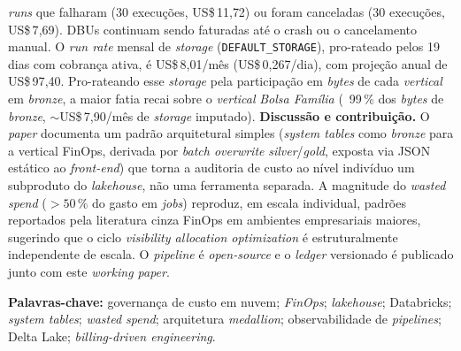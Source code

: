 \documentclass[12pt,a4paper,oneside]{article}
\newcommand{\us}{US\$\,}
\begin{document}
\begin{singlespace}
\textit{runs} que falharam (30 execuções, \us 11{,}72) ou foram
canceladas (30 execuções, \us 7{,}69). DBUs continuam sendo
faturadas até o crash ou o cancelamento manual. O \textit{run rate}
mensal de \textit{storage} (\texttt{DEFAULT\_STORAGE}), pro-rateado
pelos 19 dias com cobrança ativa, é \us 8{,}01/mês
(\us 0{,}267/dia), com projeção anual de \us 97{,}40. Pro-rateando
esse \textit{storage} pela participação em \textit{bytes} de cada
\textit{vertical} em \textit{bronze}, a maior fatia recai sobre o
\textit{vertical} \textit{Bolsa Família} (~99\,\% dos \textit{bytes}
de \textit{bronze}, \(\sim\)\us 7{,}90/mês de \textit{storage}
imputado). \textbf{Discussão e contribuição.} O \textit{paper}
documenta um padrão arquitetural simples (\textit{system tables}
como \textit{bronze} para a vertical FinOps, derivada por
\textit{batch overwrite} \textit{silver}/\textit{gold}, exposta via
JSON estático ao \textit{front-end}) que torna a auditoria de custo
ao nível indivíduo um subproduto do \textit{lakehouse}, não uma
ferramenta separada. A magnitude do \textit{wasted spend}
(\(>\!50\,\%\) do gasto em \textit{jobs}) reproduz, em escala
individual, padrões reportados pela literatura cinza FinOps em
ambientes empresariais maiores, sugerindo que o ciclo
\textit{visibility \textrightarrow{} allocation \textrightarrow{}
optimization} é estruturalmente independente de escala. O
\textit{pipeline} é \textit{open-source} e o \textit{ledger}
versionado é publicado junto com este \textit{working paper}.

\vspace{0.4cm}\noindent\textbf{Palavras-chave:}
governança de custo em nuvem; \textit{FinOps}; \textit{lakehouse};
Databricks; \textit{system tables}; \textit{wasted spend};
arquitetura \textit{medallion}; observabilidade de \textit{pipelines};
Delta Lake; \textit{billing-driven engineering}.
\end{singlespace}

\end{document}
